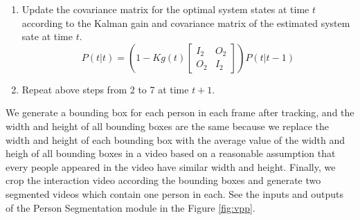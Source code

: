 \begin{enumerate}
	\item Update the covariance matrix for the optimal system states at time \(t\) according to the Kalman gain and covariance matrix of the estimated system sate at time \(t\). 
	\begin{equation}
	P(t|t) = \left(1-Kg(t)\begin{bmatrix}
	I_2&O_2 \\
	O_2&I_2
	\end{bmatrix}\right)P(t|t-1)
	\end{equation}
	
	\item Repeat above steps from 2 to 7 at time \(t+1\).
\end{enumerate}

We generate a bounding box for each person in each frame after tracking, and the width and height of all bounding boxes are the same because we replace the width and height of each bounding box with the average value of the width and heigh of all bounding boxes in a video based on a reasonable assumption that every people appeared in the video have similar width and height. Finally, we crop the interaction video according the bounding boxes and generate two segmented videos which contain one person in each. See the inputs and outputs of the Person Segmentation module in the Figure \ref{fig:vpp}.

